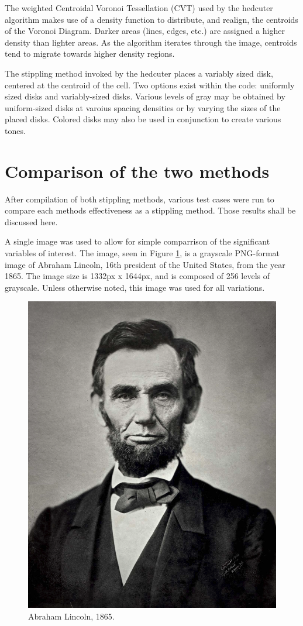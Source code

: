 \documentclass[11pt]{article}
\begin{document}
The weighted Centroidal Voronoi Tessellation (CVT) used by the hedcuter algorithm makes use of a density function to distribute, and realign, the centroids of the Voronoi Diagram. Darker areas (lines, edges, etc.) are assigned a higher density than lighter areas. As the algorithm iterates through the image, centroids tend to migrate towards higher density regions.

The stippling method invoked by the hedcuter places a variably sized disk, centered at the centroid of the cell. Two options exist within the code: uniformly sized disks and variably-sized disks. Various levels of gray may be obtained by uniform-sized disks at varoius spacing densities or by varying the sizes of the placed disks. Colored disks may also be used in conjunction to create various tones. \cite{Secord:2002:WVS:508530.508537}

\section{Comparison of the two methods}
After compilation of both stippling methods, various test cases were run to compare each methods effectiveness as a stippling method. Those results shall be discussed here.

A single image was used to allow for simple comparrison of the significant variables of interest. The image, seen in Figure \ref{fig:AbrahamLincoln}, is a grayscale PNG-format  image of Abraham Lincoln, 16th president of the United States, from the year 1865. The image size is 1332px x 1644px, and is composed of 256 levels of grayscale. Unless otherwise noted, this image was used for all variations.

\begin{figure}[H]
	\centering
	\includegraphics[width=0.5\linewidth]{pix/Abraham_Lincoln_November_1863.png}
	\caption{Abraham Lincoln, 1865.}
	\label{fig:AbrahamLincoln}
\end{figure}
\end{document}
